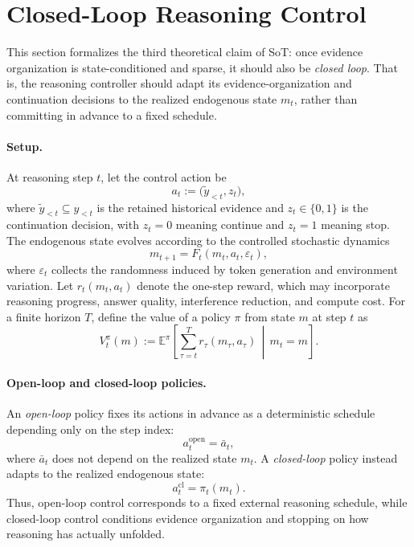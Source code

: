 \section{Closed-Loop Reasoning Control}
\label{app:theory_closed_loop}

This section formalizes the third theoretical claim of SoT:
once evidence organization is state-conditioned and sparse, it should also be \emph{closed loop}.
That is, the reasoning controller should adapt its evidence-organization and continuation decisions to the realized endogenous state \(m_t\), rather than committing in advance to a fixed schedule.

\paragraph{Setup.}
At reasoning step \(t\), let the control action be
\begin{equation}
a_t := \bigl(\widetilde y_{<t}, z_t\bigr),
\label{eq:app_closed_action}
\end{equation}
where \(\widetilde y_{<t}\subseteq y_{<t}\) is the retained historical evidence and \(z_t\in\{0,1\}\) is the continuation decision, with \(z_t=0\) meaning continue and \(z_t=1\) meaning stop.
The endogenous state evolves according to the controlled stochastic dynamics
\begin{equation}
m_{t+1} = F_t(m_t, a_t, \varepsilon_t),
\label{eq:app_closed_dynamics}
\end{equation}
where \(\varepsilon_t\) collects the randomness induced by token generation and environment variation.
Let \(r_t(m_t,a_t)\) denote the one-step reward, which may incorporate reasoning progress, answer quality, interference reduction, and compute cost.
For a finite horizon \(T\), define the value of a policy \(\pi\) from state \(m\) at step \(t\) as
\begin{equation}
V_t^{\pi}(m)
:=
\mathbb{E}^{\pi}\!\left[
\sum_{\tau=t}^{T} r_{\tau}(m_{\tau},a_{\tau})
\,\middle|\, m_t=m
\right].
\label{eq:app_closed_value}
\end{equation}

\paragraph{Open-loop and closed-loop policies.}
An \emph{open-loop} policy fixes its actions in advance as a deterministic schedule depending only on the step index:
\begin{equation}
a_t^{\mathrm{open}} = \bar a_t,
\label{eq:app_closed_open}
\end{equation}
where \(\bar a_t\) does not depend on the realized state \(m_t\).
A \emph{closed-loop} policy instead adapts to the realized endogenous state:
\begin{equation}
a_t^{\mathrm{cl}} = \pi_t(m_t).
\label{eq:app_closed_feedback}
\end{equation}
Thus, open-loop control corresponds to a fixed external reasoning schedule, while closed-loop control conditions evidence organization and stopping on how reasoning has actually unfolded.

